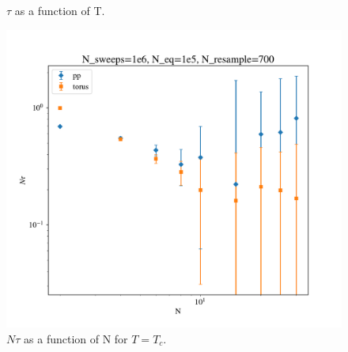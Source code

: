 \documentclass{article}
\begin{document}
\begin{figure}[ht]
  \centering
  \caption{$\tau$ as a function of T.\label{fig:tau_T}}
\end{figure}

\begin{figure}[ht]
  \centering
  \includegraphics[width=.75\textwidth]{media/tau_N}
  \caption{$N\tau$ as a function of N for $T=T_c$.\label{fig:tau_N}}
\end{figure}
\end{document}
